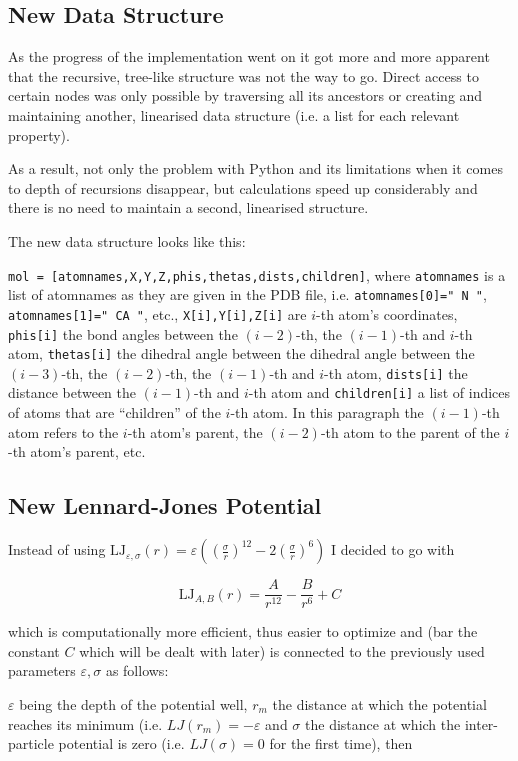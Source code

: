 \subsection{New Data Structure}
As the progress of the implementation went on it got more and more apparent that the recursive, tree-like structure was not the way to go. Direct access to certain nodes was only possible by traversing all its ancestors or creating and maintaining another, linearised data structure (i.e. a list for each relevant property).

As a result, not only the problem with Python and its limitations when it comes to depth of recursions disappear, but calculations speed up considerably and there is no need to maintain a second, linearised structure.

The new data structure looks like this:

\texttt{mol = [atomnames,X,Y,Z,phis,thetas,dists,children]}, where \texttt{atomnames} is a list of atomnames as they are given in the PDB file, i.e. \texttt{atomnames[0]=" N  "}, \texttt{atomnames[1]=" CA "}, etc., \texttt{X[i],Y[i],Z[i]} are $i$-th atom's coordinates, \texttt{phis[i]} the bond angles between the $(i-2)$-th, the $(i-1)$-th and $i$-th atom, \texttt{thetas[i]} the dihedral angle between the dihedral angle between the $(i-3)$-th, the $(i-2)$-th, the $(i-1)$-th and $i$-th atom, \texttt{dists[i]} the distance between the $(i-1)$-th and $i$-th atom and \texttt{children[i]} a list of indices of atoms that are ``children'' of the $i$-th atom.
In this paragraph the $(i-1)$-th atom refers to the $i$-th atom's parent, the $(i-2)$-th atom to the parent of the $i$-th atom's parent, etc.

\subsection{New Lennard-Jones Potential}
Instead of using $\text{LJ}_{\varepsilon,\sigma}(r) = \varepsilon \left(\left(\frac{\sigma}{r}\right)^{12} - 2 \left(\frac{\sigma}{r}\right)^6\right)$ I decided to go with

$$\text{LJ}_{A,B}(r) = \frac{A}{r^{12}}-\frac{B}{r^6}+C$$

which is computationally more efficient, thus easier to optimize and (bar the constant $C$ which will be dealt with later) is connected to the previously used parameters $\varepsilon,\sigma$ as follows:

$\varepsilon$ being the depth of the potential well, $r_m$ the distance at which the potential reaches its minimum (i.e. $LJ(r_m)=-\varepsilon$ and $\sigma$ the distance at which the inter-particle potential is zero (i.e. $LJ(\sigma)=0$ for the first time), then

